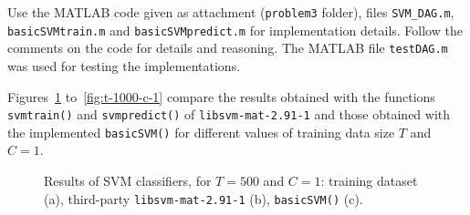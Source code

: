 \documentclass[paper=a4, fontsize=11pt]{scrartcl} %
\numberwithin{equation}{section} %
\numberwithin{figure}{section} %
\numberwithin{table}{section} %
\newcommand{\vertbreak}{\vspace{1.75 mm}}
\begin{document}
Use the MATLAB code given as attachment (\verb+problem3+ folder), files 
\verb+SVM_DAG.m+, \verb+basicSVMtrain.m+ and \verb+basicSVMpredict.m+ for 
implementation details. Follow the comments on the code for details and 
reasoning. The MATLAB file \verb+testDAG.m+ was used for testing the 
implementations.\vertbreak

Figures~\ref{fig:t-500-c-1} to~\ref{fig:t-1000-c-1} compare the results obtained 
with the functions \verb+svmtrain()+ and \verb+svmpredict()+ of 
\verb+libsvm-mat-2.91-1+ and those obtained with the implemented 
\verb+basicSVM()+ for different values of training data size $T$ and 
$C=1$.\vertbreak

\begin{figure}[H]
    \centering




    \cprotect\caption{Results of SVM classifiers, for $T = 500$ and $C = 1$: 
            training dataset (a),
            third-party \verb+libsvm-mat-2.91-1+ (b), \verb+basicSVM()+ (c).}
    \label{fig:t-500-c-1}

\end{figure}
\end{document}
